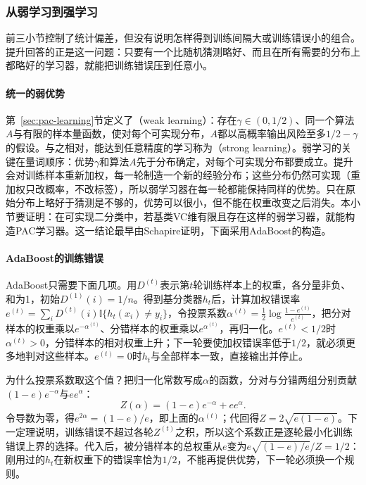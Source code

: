 \subsubsection{从弱学习到强学习}

前三小节控制了统计偏差，但没有说明怎样得到训练间隔大或训练错误小的组合。提升回答的正是这一问题：只要有一个比随机猜测略好、而且在所有需要的分布上都略好的学习器，就能把训练错误压到任意小。

\paragraph{统一的弱优势}

第~\ref{sec:pac-learning}节定义了（weak learning）：存在$\gamma\in(0,1/2)$、同一个算法$A$与有限的样本量函数，使对每个可实现分布，$A$都以高概率输出风险至多$1/2-\gamma$的假设。与之相对，能达到任意精度的学习称为（strong learning）。弱学习的关键在量词顺序：优势$\gamma$和算法$A$先于分布确定，对每个可实现分布都要成立。提升会对训练样本重新加权，每一轮制造一个新的经验分布；这些分布仍然可实现（重加权只改概率，不改标签），所以弱学习器在每一轮都能保持同样的优势。只在原始分布上略好于猜测是不够的，优势可以很小，但不能在权重改变之后消失。本小节要证明：在可实现二分类中，若基类VC维有限且存在这样的弱学习器，就能构造PAC学习器。这一结论最早由Schapire证明，下面采用AdaBoost的构造。

\paragraph{AdaBoost的训练错误}

AdaBoost只需要下面几项。用$D^{(t)}$表示第$t$轮训练样本上的权重，各分量非负、和为1，初始$D^{(1)}(i)=1/n$。得到基分类器$h_t$后，计算加权错误率$e^{(t)}=\sum_iD^{(t)}(i)\mathbb I\{h_t(x_i)\neq y_i\}$，令投票系数$\alpha^{(t)}=\frac12\log\frac{1-e^{(t)}}{e^{(t)}}$，把分对样本的权重乘以$e^{-\alpha^{(t)}}$、分错样本的权重乘以$e^{\alpha^{(t)}}$，再归一化。$e^{(t)}<1/2$时$\alpha^{(t)}>0$，分错样本的相对权重上升；下一轮要使加权错误率低于$1/2$，就必须更多地判对这些样本。$e^{(t)}=0$时$h_t$与全部样本一致，直接输出并停止。

为什么投票系数取这个值？把归一化常数写成$\alpha$的函数，分对与分错两组分别贡献$(1-e)e^{-\alpha}$与$ee^{\alpha}$：
\[
 Z(\alpha)=(1-e)e^{-\alpha}+ee^{\alpha}.
\]
令导数为零，得$e^{2\alpha}=(1-e)/e$，即上面的$\alpha^{(t)}$；代回得$Z=2\sqrt{e(1-e)}$。下一定理说明，训练错误不超过各轮$Z^{(t)}$之积，所以这个系数正是逐轮最小化训练错误上界的选择。代入后，被分错样本的总权重从$e$变为$e\sqrt{(1-e)/e}/Z=1/2$：刚用过的$h_t$在新权重下的错误率恰为$1/2$，不能再提供优势，下一轮必须换一个规则。

